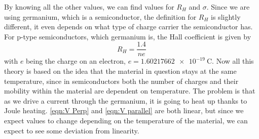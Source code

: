 \documentclass[12pt]{article}
\numberwithin{equation}{section}
\numberwithin{figure}{section}
\numberwithin{table}{section}
\begin{document}
    By knowing all the other values, we can find values for $R_H$ and $\sigma$. \newline
    Since we are using germanium, which is a semiconductor, the definition for $R_H$ is slightly 
    different, it even depends on what type of charge carrier the semiconductor has. For p-type 
    semiconductors, which germanium is, the Hall coefficient is given by 
    \begin{equation}
        R_H=\frac{1.4}{n e}
        \label{eqn:Hall Coefficient p-type}
    \end{equation}
    with $e$ being the charge on an electron, $e=\SI{1.60217662e-19}{\coulomb}$. \newline
    \newline
    Now all this theory is based on the idea that the material in question stays at the same 
    temperature, since in semiconductors both the number of charges and their mobility within the 
    material are dependent on temperature. The problem is that as we drive a current through the 
    germanium, it is going to heat up thanks to Joule heating. \autoref{eqn:V Perp} and 
    \autoref{eqn:V parallel} are both linear, but since we expect values to change depending on 
    the temperature of the material, we can expect to see some deviation from linearity. 
    
\end{document}
